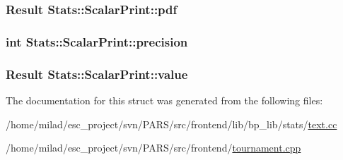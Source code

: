 \label{structStats_1_1ScalarPrint_a5be372119c7d55a9d96688aaa060cc79}
\hypertarget{structStats_1_1ScalarPrint_acd1df1a0346a2bd5dd90086550663eea}{
\subsubsection[{pdf}]{\setlength{\rightskip}{0pt plus 5cm}Result {\bf Stats::ScalarPrint::pdf}}}
\label{structStats_1_1ScalarPrint_acd1df1a0346a2bd5dd90086550663eea}
\hypertarget{structStats_1_1ScalarPrint_a879b6ff384c6685845e308118c0d82d3}{
\subsubsection[{precision}]{\setlength{\rightskip}{0pt plus 5cm}int {\bf Stats::ScalarPrint::precision}}}
\label{structStats_1_1ScalarPrint_a879b6ff384c6685845e308118c0d82d3}
\hypertarget{structStats_1_1ScalarPrint_a45fe47d5d3b39603727f5641c51ba4fd}{
\subsubsection[{value}]{\setlength{\rightskip}{0pt plus 5cm}Result {\bf Stats::ScalarPrint::value}}}
\label{structStats_1_1ScalarPrint_a45fe47d5d3b39603727f5641c51ba4fd}


The documentation for this struct was generated from the following files:\begin{DoxyCompactItemize}
\item 
/home/milad/esc\_\-project/svn/PARS/src/frontend/lib/bp\_\-lib/stats/\hyperlink{text_8cc}{text.cc}\item 
/home/milad/esc\_\-project/svn/PARS/src/frontend/\hyperlink{frontend_2tournament_8cpp}{tournament.cpp}\end{DoxyCompactItemize}
